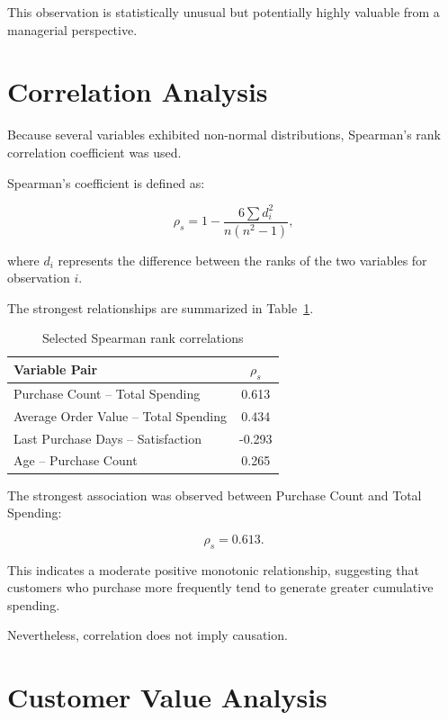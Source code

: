 \documentclass[11pt,a4paper]{article}
\begin{document}
This observation is statistically unusual but potentially highly valuable from a managerial perspective.


\section{Correlation Analysis}

Because several variables exhibited non-normal distributions, Spearman's rank correlation coefficient was used.

Spearman's coefficient is defined as:

\[
\rho_s =
1-
\frac{6\sum d_i^2}{n(n^2-1)},
\]

where $d_i$ represents the difference between the ranks of the two variables for observation $i$.

The strongest relationships are summarized in Table~\ref{tab:correlation}.

\begin{table}[H]
\centering
\caption{Selected Spearman rank correlations}
\label{tab:correlation}
\begin{tabular}{lc}
\toprule
\textbf{Variable Pair} & \boldmath$\rho_s$\\
\midrule
Purchase Count -- Total Spending & 0.613\\
Average Order Value -- Total Spending & 0.434\\
Last Purchase Days -- Satisfaction & -0.293\\
Age -- Purchase Count & 0.265\\
\bottomrule
\end{tabular}
\end{table}

The strongest association was observed between Purchase Count and Total Spending:

\[
\rho_s=0.613.
\]

This indicates a moderate positive monotonic relationship, suggesting that customers who purchase more frequently tend to generate greater cumulative spending.

Nevertheless, correlation does not imply causation.


\section{Customer Value Analysis}
\end{document}
